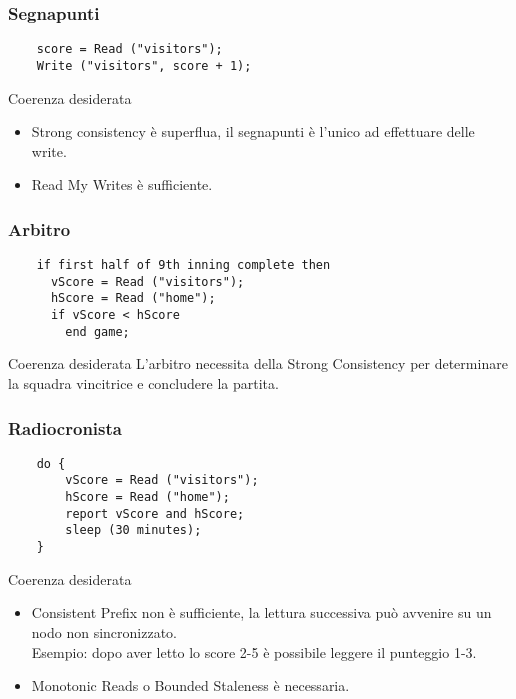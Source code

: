 \begin{frame}[fragile]
 \frametitle{Segnapunti}
  \begin{lstlisting}
    score = Read ("visitors");
    Write ("visitors", score + 1);
  \end{lstlisting}
  \pause
  \begin{block}{Coerenza desiderata}
    \begin{itemize}
      \item \alert{Strong consistency} è superflua, il segnapunti è l'unico ad effettuare delle write.
      \pause
      \item \alert{Read My Writes} è sufficiente.
    \end{itemize}     
  \end{block}
\end{frame}

\begin{frame}[fragile]
 \frametitle{Arbitro}
  \begin{lstlisting}
    if first half of 9th inning complete then
      vScore = Read ("visitors");
      hScore = Read ("home");
      if vScore < hScore
        end game;
  \end{lstlisting}
  \pause
 \begin{block}{Coerenza desiderata}
   L'arbitro necessita della \alert{Strong Consistency} per determinare la squadra vincitrice e concludere la partita.
 \end{block}
\end{frame}

\begin{frame}[fragile]
 \frametitle{Radiocronista}
  \begin{lstlisting}
    do {
        vScore = Read ("visitors");
        hScore = Read ("home");
        report vScore and hScore;
        sleep (30 minutes);
    }
  \end{lstlisting}
  \pause
  \begin{block}{Coerenza desiderata}
    \begin{itemize}
      \item \alert{Consistent Prefix} non è sufficiente, la lettura successiva può avvenire su un nodo non sincronizzato.\\
      Esempio: dopo aver letto lo score 2-5 è possibile leggere il punteggio 1-3.
      \pause
      \item \alert{Monotonic Reads} o \alert{Bounded Staleness} è necessaria. 
    \end{itemize}
  \end{block}
\end{frame}

